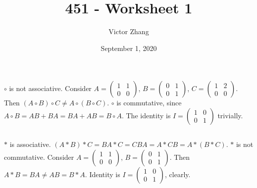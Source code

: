 \documentclass{article}
\title{451 - Worksheet 1}
\author{Victor Zhang}
\date{September 1, 2020}
\begin{document}
\maketitle

\section{}
\subsection{}
$\circ$ is not associative. Consider $A = \left( \begin{matrix} 1 & 1 \\ 0 & 0 \end{matrix} \right)$, $B = \left( \begin{matrix} 0 & 1 \\ 0 & 1 \end{matrix} \right)$, $C = \left( \begin{matrix} 1 & 2 \\ 0 & 0 \end{matrix} \right)$. Then $(A\circ B) \circ C \neq A\circ (B \circ C)$. $\circ$ is commutative, since $A \circ B = AB+BA = BA+AB = B \circ A$. The identity is $I = \left( \begin{matrix} 1 & 0 \\ 0 & 1 \end{matrix} \right)$ trivially.

\subsection{}
$*$ is associative. $(A*B)*C = BA*C = CBA = A*CB = A*(B*C)$. $*$ is not commutative. Consider $A = \left( \begin{matrix} 1 & 1 \\ 0 & 0 \end{matrix} \right)$, $B = \left( \begin{matrix} 0 & 1 \\ 0 & 1 \end{matrix} \right)$. Then $A*B = BA \neq AB = B*A$. Identity is $I = \left( \begin{matrix} 1 & 0 \\ 0 & 1 \end{matrix} \right)$, clearly.
\end{document}
